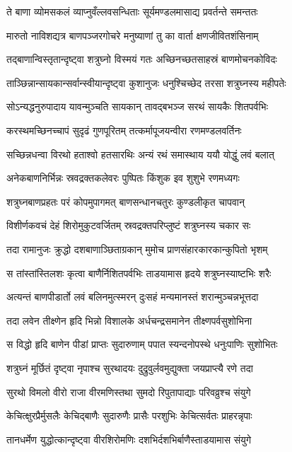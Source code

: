 \twolineshloka
{ते बाणा व्योमसकलं व्याप्नुवँल्लवसन्धिताः}
{सूर्यमण्डलमासाद्य प्रवर्तन्ते समन्ततः}%

\twolineshloka
{मारुतो नाविशद्यत्र बाणपञ्जरगोचरे}
{मनुष्याणां तु का वार्ता क्षणजीवितशंसिनाम्}%

\twolineshloka
{तद्बाणान्विस्तृतान्दृष्ट्वा शत्रुघ्नो विस्मयं गतः}
{अच्छिनच्छतसाहस्रं बाणमोचनकोविदः}%

\twolineshloka
{ताञ्छिन्नान्सायकान्सर्वान्स्वीयान्दृष्ट्वा कुशानुजः}
{धनुश्चिच्छेद तरसा शत्रुघ्नस्य महीपतेः}%

\twolineshloka
{सोऽन्यद्धनुरुपादाय यावन्मुञ्चति सायकान्}
{तावद्बभञ्ज सरथं सायकैः शितपर्वभिः}%

\twolineshloka
{करस्थमच्छिनच्चापं सुदृढं गुणपूरितम्}
{तत्कर्मापूजयन्वीरा रणमण्डलवर्तिनः}%

\twolineshloka
{सच्छिन्नधन्वा विरथो हताश्वो हतसारथिः}
{अन्यं रथं समास्थाय ययौ योद्धुं लवं बलात्}%

\twolineshloka
{अनेकबाणनिर्भिन्नः स्रवद्रक्तकलेवरः}
{पुष्पितः किंशुक इव शुशुभे रणमध्यगः}%

\twolineshloka
{शत्रुघ्नबाणप्रहतः परं कोपमुपागमत्}
{बाणसन्धानचतुरः कुण्डलीकृत चापवान्}%

\twolineshloka
{विशीर्णकवचं देहं शिरोमुकुटवर्जितम्}
{स्रवद्रक्तपरिप्लुष्टं शत्रुघ्नस्य चकार सः}%

\twolineshloka
{तदा रामानुजः क्रुद्धो दशबाणाञ्छिताग्रकान्}
{मुमोच प्राणसंहारकारकान्कुपितो भृशम्}%

\twolineshloka
{स तांस्तांस्तिलशः कृत्वा बाणैर्निशितपर्वभिः}
{ताडयामास हृदये शत्रुघ्नस्याष्टभिः शरैः}%

\twolineshloka
{अत्यन्तं बाणपीडार्तो लवं बलिनमुत्स्मरन्}
{दुःसहं मन्यमानस्तं शरान्मुञ्चन्नभूत्तदा}%

\twolineshloka
{तदा लवेन तीक्ष्णेन हृदि भिन्नो विशालके}
{अर्धचन्द्रसमानेन तीक्ष्णपर्वसुशोभिना}%

\twolineshloka
{स विद्धो हृदि बाणेन पीडां प्राप्तः सुदारुणाम्}
{पपात स्यन्दनोपस्थे धनुःपाणिः सुशोभितः}%

\twolineshloka
{शत्रुघ्नं मूर्छितं दृष्ट्वा नृपाश्च सुरथादयः}
{दुद्रुवुर्लवमुद्युक्ता जयप्राप्त्यै रणे तदा}%

\twolineshloka
{सुरथो विमलो वीरो राजा वीरमणिस्तथा}
{सुमदो रिपुतापाद्याः परिवव्रुश्च संयुगे}%

\twolineshloka
{केचित्क्षुरप्रैर्मुसलैः केचिद्बाणैः सुदारुणैः}
{प्रासैः परशुभिः केचित्सर्वतः प्राहरन्नृपाः}%

\twolineshloka
{तानधर्मेण युद्धोत्कान्दृष्ट्वा वीरशिरोमणिः}
{दशभिर्दशभिर्बाणैस्ताडयामास संयुगे}%

